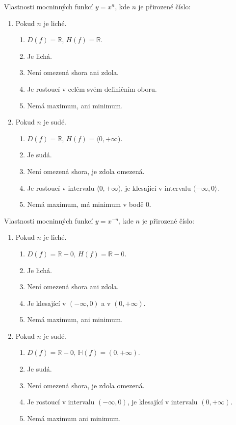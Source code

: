 \begin{veta}
  Vlastnosti mocninných funkcí $y= x^n$, kde $n$ je přirozené číslo:
  \begin{enumerate}[1.]
    \item Pokud $n$ je liché.
    \begin{enumerate}[$i.$]
      \item $D(f)= \mathbb R$, $H(f)= \mathbb R$.
      \item Je lichá.
      \item Není omezená shora ani zdola.
      \item Je rostoucí v celém svém definičním oboru.
      \item Nemá maximum, ani minimum.
    \end{enumerate}
    \item Pokud $n$ je sudé.
    \begin{enumerate}[$i.$]
      \item $D(f)= \mathbb R$, $H(f)= \langle 0,+\infty )$.
      \item Je sudá.
      \item Není omezená shora, je zdola omezená.
      \item Je rostoucí v intervalu $\langle 0,+\infty )$, je klesající v intervalu $( -\infty,0 \rangle $.
      \item Nemá maximum, má minimum v bodě $0$.
    \end{enumerate}
  \end{enumerate}
\end{veta}

\begin{veta}
  Vlastnosti mocninných funkcí $y= x^{-n}$, kde $n$ je přirozené číslo:
  \begin{enumerate}[1.]
    \item Pokud $n$ je liché.
    \begin{enumerate}[$i.$]
      \item $D(f)= \mathbb R - {0}$, $H(f)= \mathbb R - {0}$.
      \item Je lichá.
      \item Není omezená shora ani zdola.
      \item Je klesající v $( -\infty,0)$ a v $( 0,+\infty )$.
      \item Nemá maximum, ani minimum.
    \end{enumerate}
    \item Pokud $n$ je sudé.
    \begin{enumerate}[$i.$]
      \item $D(f)= \mathbb R - {0}$, $\mathbb H(f)= ( 0,+\infty )$.
      \item Je sudá.
      \item Není omezená shora, je zdola omezená.
      \item Je rostoucí v intervalu $( -\infty,0 ) $, je klesající v intervalu $( 0,+\infty )$.
      \item Nemá maximum ani minimum.
    \end{enumerate}
  \end{enumerate}
\end{veta}

